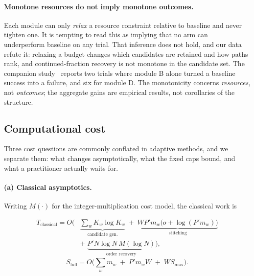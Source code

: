 \documentclass[final,5p,times,longtitle]{elsarticle}
\newcommand{\Smax}{S_{\max}}
\begin{document}
\paragraph{Monotone resources do not imply monotone outcomes.} Each
module can only \emph{relax} a resource constraint relative to baseline
and never tighten one. It is tempting to read this as implying that no
arm can underperform baseline on any trial. That inference does not hold,
and our data refute it: relaxing a budget changes which candidates are
retained and how paths rank, and continued-fraction recovery is not
monotone in the candidate set. The companion study~\cite{companion} reports two
trials where module B alone turned a baseline success into a failure, and
six for module D. The monotonicity concerns \emph{resources}, not
\emph{outcomes}; the aggregate gains are empirical results, not
corollaries of the structure.

\subsection{Computational cost}
\label{sec:cost}

Three cost questions are commonly conflated in adaptive methods, and we
separate them: what changes asymptotically, what the fixed caps bound,
and what a practitioner actually waits for.

\paragraph{(a) Classical asymptotics.} Writing $M(\cdot)$ for the
integer-multiplication cost model, the classical work is

\begin{equation}
\begin{split}
T_{\text{classical}} = O\Big(
&\underbrace{\textstyle\sum_w K_w\log K_w}_{\text{candidate gen.}} \;+\;
\underbrace{W P' m_w\big(o+\log(P'm_w)\big)}_{\text{stitching}} \\[2pt]
&+\;\underbrace{P' N\log N\, M(\log N)}_{\text{order recovery}}
\Big),
\end{split}
\label{eq:cost}
\end{equation}
\begin{equation}
S_{\text{full}} = O\!\Big(\textstyle\sum_w m_w \;+\; P' m_w W \;+\; W \Smax\Big).
\label{eq:space}
\end{equation}
\end{document}
